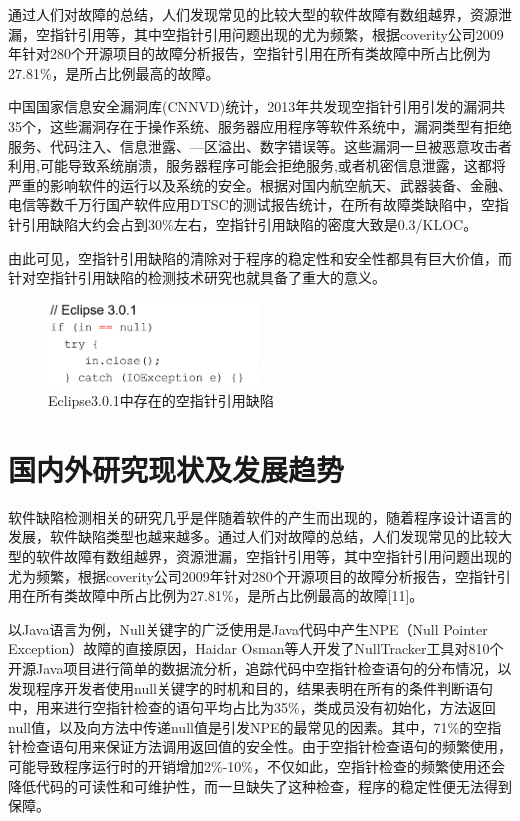 通过人们对故障的总结，人们发现常见的比较大型的软件故障有数组越界，资源泄漏，空指针引用等，其中空指针引用问题出现的尤为频繁，根据coverity公司2009年针对280个开源项目的故障分析报告，空指针引用在所有类故障中所占比例为27.81\%，是所占比例最高的故障\cite{coverity2009}。


中国国家信息安全漏洞库(CNNVD)统计，2013年共发现空指针引用引发的漏洞共35个，这些漏洞存在于操作系统、服务器应用程序等软件系统中，漏洞类型有拒绝服务、代码注入、信息泄露、—区溢出、数字错误等。这些漏洞一旦被恶意攻击者利用,可能导致系统崩溃，服务器程序可能会拒绝服务,或者机密信息泄露，这都将严重的影响软件的运行以及系统的安全。根据对国内航空航天、武器装备、金融、电信等数千万行国产软件应用DTSC的测试报告统计，在所有故障类缺陷中，空指针引用缺陷大约会占到30\%左右，空指针引用缺陷的密度大致是0.3/KLOC。

由此可见，空指针引用缺陷的清除对于程序的稳定性和安全性都具有巨大价值，而针对空指针引用缺陷的检测技术研究也就具备了重大的意义。
 \begin{figure}
 \centering
 \includegraphics[width=0.50\textwidth]{figures/NullPointer1-1}
 \caption{Eclipse3.0.1中存在的空指针引用缺陷}\label{fig:figure1-1}
\end{figure}

\section{国内外研究现状及发展趋势}

软件缺陷检测相关的研究几乎是伴随着软件的产生而出现的，随着程序设计语言的发展，软件缺陷类型也越来越多。通过人们对故障的总结，人们发现常见的比较大型的软件故障有数组越界，资源泄漏，空指针引用等，其中空指针引用问题出现的尤为频繁，根据coverity公司2009年针对280个开源项目的故障分析报告，空指针引用在所有类故障中所占比例为27.81\%，是所占比例最高的故障[11]。

以Java语言为例，Null关键字的广泛使用是Java代码中产生NPE（Null Pointer Exception）故障的直接原因，Haidar Osman\cite{osman2016tracking}等人开发了NullTracker工具对810个开源Java项目进行简单的数据流分析，追踪代码中空指针检查语句的分布情况，以发现程序开发者使用null关键字的时机和目的，结果表明在所有的条件判断语句中，用来进行空指针检查的语句平均占比为35\%，类成员没有初始化，方法返回null值，以及向方法中传递null值是引发NPE的最常见的因素。其中，71\%的空指针检查语句用来保证方法调用返回值的安全性。由于空指针检查语句的频繁使用，可能导致程序运行时的开销增加2\%-10\%，不仅如此，空指针检查的频繁使用还会降低代码的可读性和可维护性，而一旦缺失了这种检查，程序的稳定性便无法得到保障。


